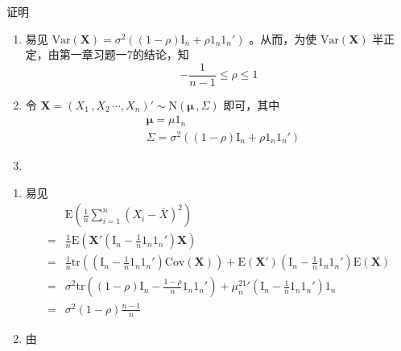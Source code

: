 \documentclass[12pt,hyperref,]{ctexart}
\begin{document}
\vspace{1em}

\heiti

证明

\songti

\begin{enumerate}
\def\labelenumi{(\arabic{enumi})}
\item
  易见
  \(\mathrm{Var}(\mathbf{X})=\sigma^2((1-\rho)\mathrm{I}_n+\rho 1_n1_n')\)
  。从而，为使 \(\mathrm{Var}(\mathbf{X})\)
  半正定，由第一章习题一7的结论，知 \begin{equation*}
  -\frac{1}{n-1}\le \rho \le 1
  \end{equation*}
\item
  令
  \(\mathbf{X}=(X_1\, ,X_2\, \cdots ,X_n)'\sim\mathrm{N}(\boldsymbol{\mu}\, ,\Sigma)\)
  即可，其中 \begin{equation*}
  \begin{aligned}
  & \boldsymbol{\mu}=\mu1_n \\
  & \Sigma=\sigma^2((1-\rho)\mathrm{I}_n+\rho 1_n1_n')
  \end{aligned}
  \end{equation*}
\item
\end{enumerate}

\begin{enumerate}
\def\labelenumi{(\roman{enumi})}
\item
  易见 \begin{equation*}
  \begin{aligned}
  & \mathrm{E}\left(\frac 1n \sum_{i=1}^{n}(X_i-\bar{X})^2\right) \\
  =& \frac 1n \mathrm{E}\left(\mathbf{X}'\left(\mathrm{I}_n-\frac 1n 1_n1_n'\right)\mathbf{X}\right) \\
  =& \frac 1n \mathrm{tr}\left(\left(\mathrm{I}_n-\frac 1n 1_n1_n'\right)\mathrm{Cov}(\mathbf{X})\right)+\mathrm{E}(\mathbf{X}')\left(\mathrm{I}_n-\frac 1n 1_n1_n'\right)\mathrm{E}(\mathbf{X}) \\
  =& \sigma^2\mathrm{tr}\left((1-\rho)\mathrm{I}_n-\frac{1-\rho}{n}1_n1_n'\right)+\mu^21_n'\left(\mathrm{I}_n-\frac 1n 1_n1_n'\right)1_n \\
  =& \sigma^2(1-\rho)\frac{n-1}{n}
  \end{aligned}
  \end{equation*}
\item
  由
\end{enumerate}
\end{document}
